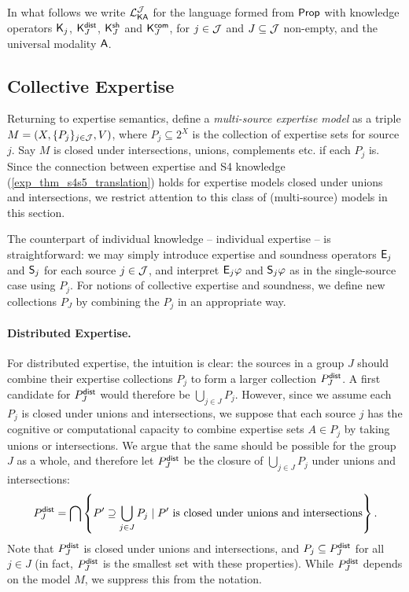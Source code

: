 In what follows we write $\cLKAJ$ for the language formed from $\Prop$ with
knowledge operators $\K_j$, $\Kdist_J$, $\Kshared_J$ and $\Kcommon_J$, for $j
\in \J$ and $J \subseteq \J$ non-empty, and the universal modality $\A$.

\subsection{Collective Expertise}
\label{exp_sec_collective_expertise}

Returning to expertise semantics, define a \emph{multi-source expertise model}
as a triple $M = (X, \{P_j\}_{j \in \J}, V)$, where $P_j \subseteq 2^X$ is the
collection of expertise sets for source $j$. Say $M$ is closed under
intersections, unions, complements etc. if each $P_j$ is. Since the connection
between expertise and S4 knowledge (\cref{exp_thm_s4s5_translation}) holds for
expertise models closed under unions and intersections, we restrict
attention to this class of (multi-source) models in this section.

The counterpart of individual knowledge -- individual expertise -- is
straightforward: we may simply introduce expertise and soundness operators
$\E_j$ and $\S_j$ for each source $j \in \J$, and interpret
$\E_j\phi$ and $\S_j\phi$ as in the single-source case using
$P_j$. For notions of collective expertise and soundness, we define new
collections $P_J$ by combining the $P_j$ in an appropriate way.

\paragraph{Distributed Expertise.}

For distributed expertise, the intuition is clear: the sources in a group
$J$ should combine their expertise collections $P_j$ to form a
larger collection $\Pdist_J$. A first candidate for $\Pdist_J$
would therefore be $\bigcup_{j \in J}{P_j}$. However, since we assume
each $P_j$ is closed under unions and intersections, we suppose that each
source $j$ has the cognitive or computational capacity to combine expertise
sets $A \in P_j$ by taking unions or intersections. We argue that the
same should be possible for the group $J$ as a whole, and therefore let
$\Pdist_J$ be the closure of $\bigcup_{j \in J}{P_j}$ under unions
and intersections:
\[
\Pdist_J
= \bigcap\left\{
 P' \supseteq \bigcup_{j \in J}{P_j}
 \mid
 P' \text{ is closed under unions and intersections}
\right\}.\]
Note that $\Pdist_J$ is closed under unions and intersections, and
$P_j \subseteq \Pdist_J$ for all $j \in J$ (in fact,
$\Pdist_J$ is the smallest set with these properties). While
$\Pdist_J$ depends on the model $M$, we suppress this from the
notation.

